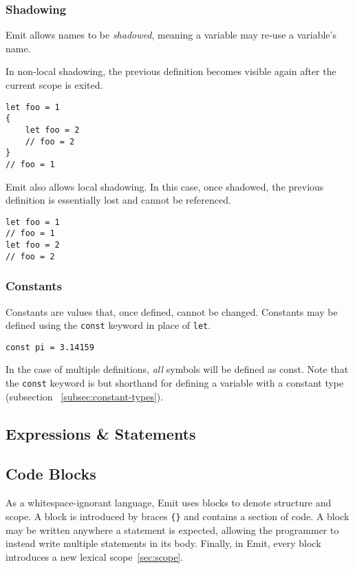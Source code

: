 \documentclass{article}
\begin{document}
    \subsubsection{Shadowing}

    Emit allows names to be \textit{shadowed}, meaning a variable may re-use a variable's name.

    In non-local shadowing, the previous definition becomes visible again after the current scope is exited.
    \begin{lstlisting}[language=CustomLang]
let foo = 1
{
    let foo = 2
    // foo = 2
}
// foo = 1
    \end{lstlisting}

    Emit also allows local shadowing.
    In this case, once shadowed, the previous definition is essentially lost and cannot be referenced.
    \begin{lstlisting}[language=CustomLang]
let foo = 1
// foo = 1
let foo = 2
// foo = 2
    \end{lstlisting}

    \subsubsection{Constants}

    Constants are values that, once defined, cannot be changed.
    Constants may be defined using the \texttt{const} keyword in place of \texttt{let}.

    \begin{lstlisting}[language=CustomLang]
const pi = 3.14159
    \end{lstlisting}

    In the case of multiple definitions, \textit{all} symbols will be defined as const.
    Note that the \texttt{const} keyword is but shorthand for defining a variable with a constant type (subsection ~\ref{subsec:constant-types}).

    \subsection{Expressions \& Statements}\label{subsec:expressions-&-statements}

    \subsection{Code Blocks}\label{subsec:code-blocks}

    As a whitespace-ignorant language, Emit uses blocks to denote structure and scope.
    A block is introduced by braces \texttt{\{\}} and contains a section of code.
    A block may be written anywhere a statement is expected, allowing the programmer to instead write multiple statements in its body.
    Finally, in Emit, every block introduces a new lexical scope~\ref{sec:scope}.
\end{document}
